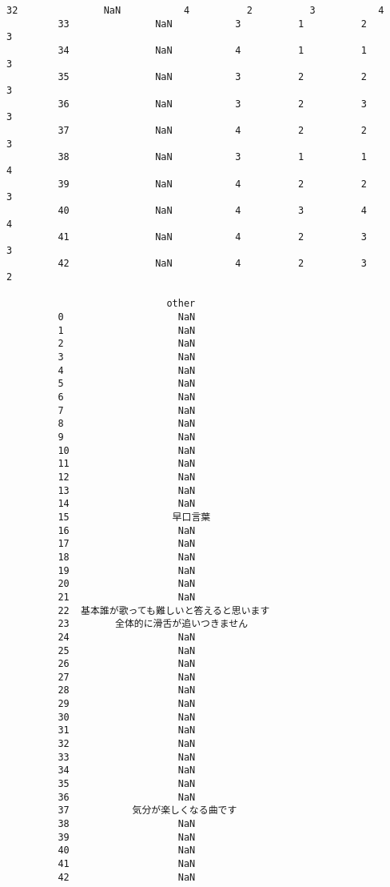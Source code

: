 \documentclass[11pt]{article}
\begin{document}
\begin{Verbatim}[commandchars=\\\{\}]
         32               NaN           4          2          3           4   
         33               NaN           3          1          2           3   
         34               NaN           4          1          1           3   
         35               NaN           3          2          2           3   
         36               NaN           3          2          3           3   
         37               NaN           4          2          2           3   
         38               NaN           3          1          1           4   
         39               NaN           4          2          2           3   
         40               NaN           4          3          4           4   
         41               NaN           4          2          3           3   
         42               NaN           4          2          3           2   
         
                            other  
         0                    NaN  
         1                    NaN  
         2                    NaN  
         3                    NaN  
         4                    NaN  
         5                    NaN  
         6                    NaN  
         7                    NaN  
         8                    NaN  
         9                    NaN  
         10                   NaN  
         11                   NaN  
         12                   NaN  
         13                   NaN  
         14                   NaN  
         15                  早口言葉  
         16                   NaN  
         17                   NaN  
         18                   NaN  
         19                   NaN  
         20                   NaN  
         21                   NaN  
         22  基本誰が歌っても難しいと答えると思います  
         23        全体的に滑舌が追いつきません  
         24                   NaN  
         25                   NaN  
         26                   NaN  
         27                   NaN  
         28                   NaN  
         29                   NaN  
         30                   NaN  
         31                   NaN  
         32                   NaN  
         33                   NaN  
         34                   NaN  
         35                   NaN  
         36                   NaN  
         37           気分が楽しくなる曲です  
         38                   NaN  
         39                   NaN  
         40                   NaN  
         41                   NaN  
         42                   NaN  
\end{Verbatim}
            
\end{document}
